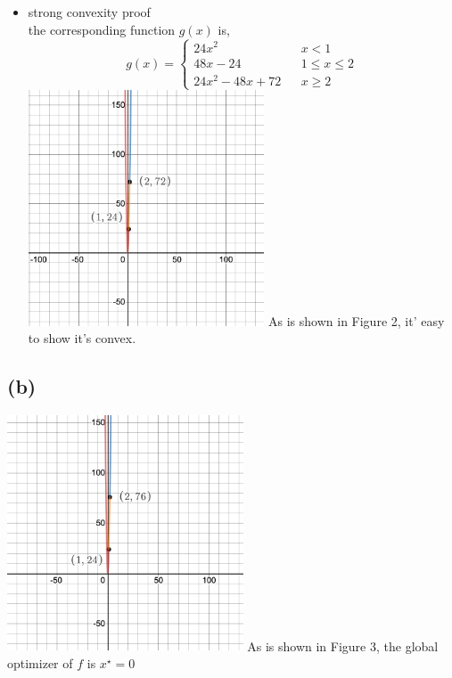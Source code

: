 \documentclass[12pt, a4 paper]{article}
\begin{document}
\begin{framed}
\begin{itemize}
            \item strong convexity proof\\
            \indent the corresponding function $g(x)$ is,
            $$ g(x)=\left\{
                \begin{array}{lcl}
                24x^2       &      & {x      <      1}\\
                48x-24    &      & {1 \leq x \leq 2}\\
                24x^{2}-48x+72     &      & {x \geq 2}
                \end{array} \right. 
            $$
            {\centering
            \includegraphics[width=7cm, height=7cm]{3a2.png}
            }
            As is shown in Figure 2, it' easy to show it's convex.
        \end{itemize}

        \subsection{(b)}
        {\centering
        \includegraphics[width=7cm, height=7cm]{3b.png}
        }
        As is shown in Figure 3, the global optimizer of 
        $f$ is $x^{\star}=0$\\


\end{framed}
\end{document}
